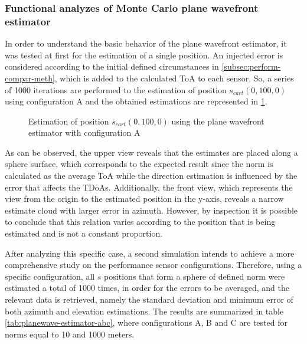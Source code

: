 \subsubsection{Functional analyzes of Monte Carlo plane wavefront estimator}

In order to understand the basic behavior of the plane wavefront estimator, it was tested at first for the estimation of a single position. An injected error is considered according to the initial defined circumstances in \ref{subsec:perform-compar-meth}, which is added to the calculated ToA to each sensor. So, a series of 1000 iterations are performed to the estimation of position $s_{cart}(0,100,0)$ using configuration A and the obtained estimations are represented in \ref{fig:plot-wavefront-0,100,0-A}.

\begin{figure}[!htbp]
	\captionsetup{justification=centering,margin=2cm}
	\caption{Estimation of position $s_{cart}(0,100,0)$ using the plane wavefront estimator with configuration A}
	\label{fig:plot-wavefront-0,100,0-A}
\end{figure}

As can be observed, the upper view reveals that the estimates are placed along a sphere surface, which corresponds to the expected result since the norm is calculated as the average ToA while the direction estimation is influenced by the error that affects the TDoAs. Additionally, the front view, which represents the view from the origin to the estimated position in the y-axis, reveals a narrow estimate cloud with larger error in azimuth. However, by inspection it is possible to conclude that this relation varies according to the position that is being estimated and is not a constant proportion.

After analyzing this specific case, a second simulation intends to achieve a more comprehensive study on the performance sensor configurations. Therefore, using a specific configuration, all $s$ positions that form a sphere of defined norm were estimated a total of 1000 times, in order for the errors to be averaged, and the relevant data is retrieved, namely the standard deviation and minimum error of both azimuth and elevation estimations. The results are summarized in table \ref{tab:planewave-estimator-abc}, where configurations A, B and C are tested for norms equal to 10 and 1000 meters.

